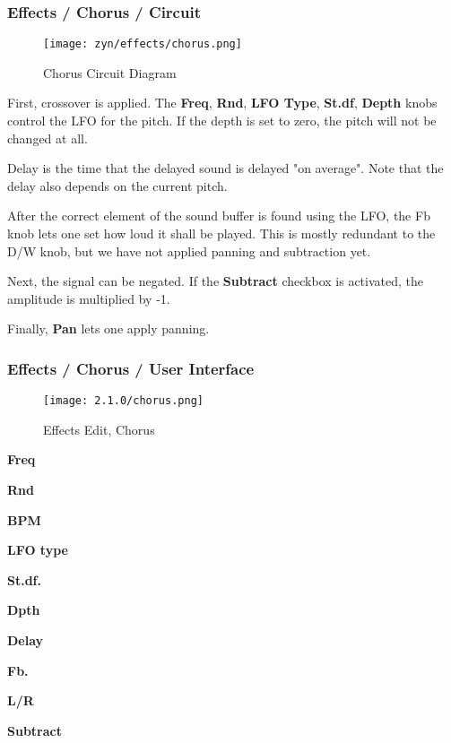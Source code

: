 \subsubsection{Effects / Chorus / Circuit}
\label{subsubsec:effects_edit_chorus_circuit}

\begin{figure}[H]
   \centering
   \texttt{[image: zyn/effects/chorus.png]}
   \caption{Chorus Circuit Diagram}
   \label{fig:chorus_circuit_diagram}
\end{figure}

   First, crossover is applied.
   The \textbf{Freq}, \textbf{Rnd}, \textbf{LFO Type}, \textbf{St.df},
   \textbf{Depth} knobs control the LFO
   for the pitch. If the depth is set to zero, the pitch will not be changed
   at all.

   Delay is the time that the delayed sound is delayed "on average". Note
   that the delay also depends on the current pitch.

   After the correct element of the sound buffer is found using the LFO, the
   Fb knob lets one set how loud it shall be played. This is mostly redundant
   to the D/W knob, but we have not applied panning and subtraction yet.

   Next, the signal can be negated. If the \textbf{Subtract}
   checkbox is activated, the amplitude is multiplied by -1.

   Finally, \textbf{Pan} lets one apply panning.

\subsubsection{Effects / Chorus / User Interface}
\label{subsubsec:effects_edit_chorus_ui}

\begin{figure}[H]
   \centering
   \texttt{[image: 2.1.0/chorus.png]}
   \caption{Effects Edit, Chorus}
   \label{fig:effects_edit_chorus}
\end{figure}

   \begin{enumber}
      \item \textbf{Freq}
      \item \textbf{Rnd}
      \item \textbf{BPM}
      \item \textbf{LFO type}
      \item \textbf{St.df.}
      \item \textbf{Dpth}
      \item \textbf{Delay}
      \item \textbf{Fb.}
      \item \textbf{L/R}
      \item \textbf{Subtract}
   \end{enumber}

